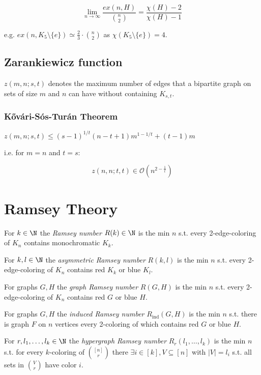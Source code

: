 $$\lim_{n \to \infty} \frac{ex(n,H)}{{n \choose 2}} = \frac{\chi(H)-2}{\chi(H)-1}$$

e.g. $ex(n,K_5 \setminus \{e\}) \simeq \frac{2}{3} \cdot {n \choose 2}$ as $\chi(K_5 \setminus \{e\}) = 4$.

\subsection*{Zarankiewicz function}

$z(m,n;s,t)$ denotes the maximum number of edges that a bipartite graph on sets of size $m$ and $n$ can have without containing $K_{s,t}$.

\subsubsection*{K\H{o}v\'{a}ri-S\'{o}s-Tur\'{a}n Theorem}

$z(m,n;s,t) \leq (s-1)^{1/t}(n-t+1)m^{1-1/t}+(t-1)m$

i.e. for $m=n$ and $t=s$:

\vspace*{-2mm}
$$z(n,n;t,t) \in \mathcal{O}(n^{2-\frac{1}{t}})$$

\section*{Ramsey Theory}

For $k \in \N$ the \emph{Ramsey number} $R(k) \in \N$ is the min $n$ s.t. every 2-edge-coloring of $K_n$ contains monochromatic $K_k$.

\spacing

For $k, l \in \N$ the \emph{asymmetric Ramsey number} $R(k,l)$ is the min $n$ s.t. every 2-edge-coloring of $K_n$ contains red $K_k$ or blue $K_l$.

\spacing

For graphs $G, H$ the \emph{graph Ramsey number} $R(G,H)$ is the min $n$ s.t. every 2-edge-coloring of $K_n$ contains red $G$ or blue $H$.

\spacing

For graphs $G, H$ the \emph{induced Ramsey number} $R_\text{ind}(G,H)$ is the min $n$ s.t. there is graph $F$ on $n$ vertices every 2-coloring of which contains red $G$ or blue $H$.

\spacing

For $r, l_1, \dots, l_k \in \N$ the \emph{hypergraph Ramsey number} $R_r(l_1,\dots,l_k)$ is the min $n$ s.t. for every $k$-coloring of ${[n] \choose r}$ there $\exists i \in [k], V \subseteq [n]$ with $|V|=l_i$ s.t. all sets in $V \choose r$ have color $i$.

